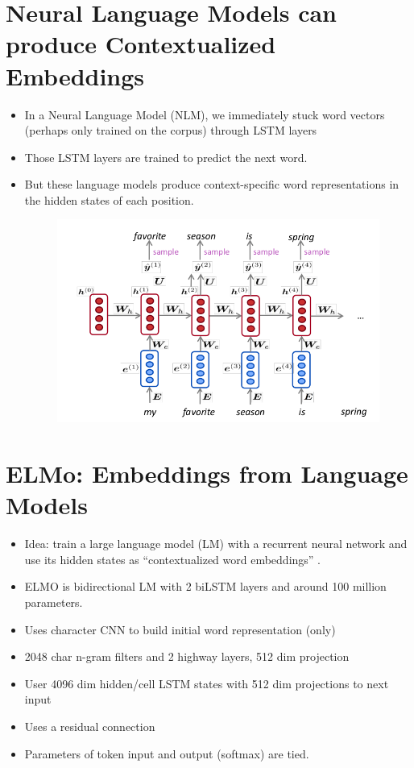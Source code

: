 \section{Neural Language Models can produce Contextualized Embeddings}
\begin{itemize}
\item In a Neural Language Model (NLM), we immediately stuck word vectors (perhaps only trained on the corpus) through LSTM layers
\item  Those LSTM layers are trained to predict the next word.
\item  But these language models produce context-specific word representations in the hidden states of each position.

    \begin{figure}[h]
        	\includegraphics[scale = 0.4]{pics/lstm_nlm.png}
        \end{figure}  


\end{itemize}



\section{ELMo: Embeddings from Language Models}
\begin{itemize}
\item Idea: train a large language model (LM)  with a recurrent neural network and use its hidden states as ``contextualized word embeddings'' 
\cite{peters-etal-2018-deep}. 

\item ELMO is bidirectional LM with 2 biLSTM layers and around 100 million parameters.
\item  Uses character CNN to build initial word representation (only)
\item  2048 char n-gram filters and 2 highway layers, 512 dim projection
\item  User 4096 dim hidden/cell LSTM states with 512 dim projections to next input
\item  Uses a residual connection
\item  Parameters of token input and output (softmax) are tied.

\end{itemize}

